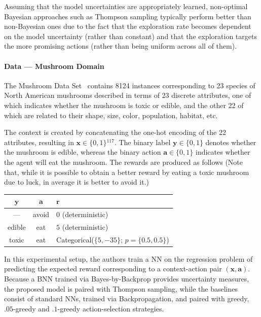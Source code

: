 \documentclass[11pt]{article}
\begin{document}
Assuming that the model uncertainties are appropriately learned, non-optimal
Bayesian approaches such as Thompson sampling typically perform better than
non-Bayesian ones due to the fact that the exploration rate becomes dependent
on the model uncertainty (rather than constant) and that the exploration
targets the more promising actions (rather than being uniform across all of
them).

\paragraph{Data --- Mushroom Domain} The Mushroom Data Set~\cite{mushroom}
contains 8124 instances corresponding to 23 species of North American mushrooms
described in terms of 23 discrete attributes, one of which indicates whether
the mushroom is toxic or edible, and the other 22 of which are related to their
shape, size, color, population, habitat, etc.

The context is created by concatenating the one-hot encoding of the 22
attributes, resulting in $\bm x\in \{0, 1\}{}^{117}$.  The binary label $\bm
y\in\{0, 1\}$ denotes whether the mushroom is edible, whereas the binary action
$\bm a\in \{0, 1\}$ indicates whether the agent will eat the mushroom.  The
rewards are produced as follows (Note that, while it is possible to obtain
a better reward by eating a toxic mushroom due to luck, in average it is better
to avoid it.)

\begin{center}
\begin{tabular}{ccl}
  $\bm y$ & $\bm a$ & $\bm r$ \\ 
  \toprule
  --- & avoid & $0$ (deterministic) \\
  edible & eat & $5$ (deterministic) \\
  toxic & eat & Categorical\@($\{5, -35\}$; $p=\{0.5, 0.5\}$) \\  
\end{tabular}
\end{center}

In this experimental setup, the authors train a NN on the regression problem of
predicting the expected reward corresponding to a context-action pair $(\bm x,
\bm a)$.  Because a BNN trained via Bayes-by-Backprop provides uncertainty
measures, the proposed model is paired with Thompson sampling, while the
baselines consist of standard NNs, trained via Backpropagation, and paired with
greedy, $.05$-greedy and $.1$-greedy action-selection strategies.
\end{document}
